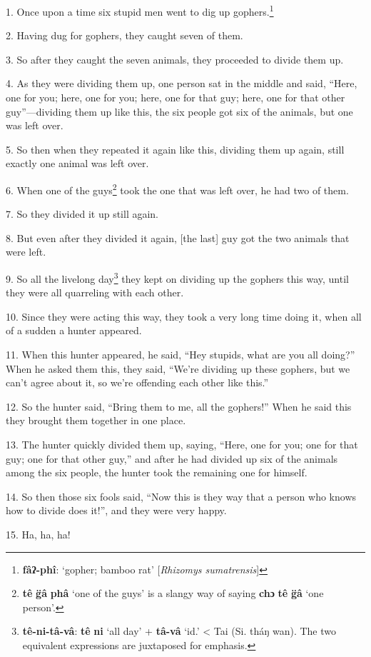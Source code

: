 \setcounter{footnote}{0}

1. Once upon a time six stupid men went to dig up gophers.\footnote{\textbf{fâʔ-phî}: `gopher; bamboo rat' [\textit{Rhizomys sumatrensis}]}

2. Having dug for gophers, they caught seven of them.

3. So after they caught the seven animals, they proceeded to divide them up.

4. As they were dividing them up, one person sat in the middle and said, ``Here,
one for you; here, one for you; here, one for that guy; here, one for that other
guy''---dividing them up like this, the six people got six of the animals, but
one was left over.

5. So then when they repeated it again like this, dividing them up again, still
exactly one animal was left over.

6. When one of the guys\footnote{\textbf{tê} \textbf{g̈â} \textbf{phâ} `one of the guys' is a slangy way of saying \textbf{chɔ} \textbf{tê} \textbf{g̈â} `one person'.} took the one that was left over, he had two of them.

7. So they divided it up still again.

8. But even after they divided it again, [the last] guy got the two animals that
were left.

9. So all the livelong day\footnote{\textbf{tê-ni-tâ-vâ}: \textbf{tê} \textbf{ni} `all day' + \textbf{tâ-vâ} `id.' < Tai (Si. tháŋ wan). The two equivalent expressions are juxtaposed for emphasis.} they kept on dividing up the gophers this way, until
they were all quarreling with each other.

10. Since they were acting this way, they took a very long time doing it, when
all of a sudden a hunter appeared.

11. When this hunter appeared, he said, ``Hey stupids, what are you all doing?''
When he asked them this, they said, ``We're dividing up these gophers, but we can't
agree about it, so we're offending each other like this.''

12. So the hunter said, ``Bring them to me, all the gophers!'' When he said this
they brought them together in one place.

13. The hunter quickly divided them up, saying, ``Here, one for you; one for that
guy; one for that other guy,'' and after he had divided up six of the animals among
the six people, the hunter took the remaining one for himself.

14. So then those six fools said, ``Now this is they way that a person who knows
how to divide does it!'', and they were very happy.

15. Ha, ha, ha!


